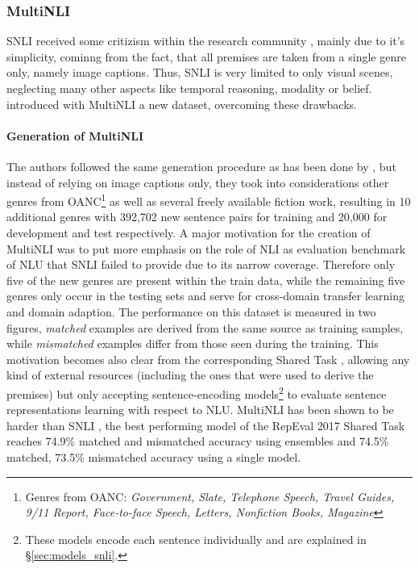 \subsubsection{MultiNLI}
\ac{SNLI} received some critizism within the research community \citep{chatzikyriakidis2017overview,williams2017broad}, mainly due to it's simplicity, cominng from the fact, that all premises are taken from a single genre only, namely image captions. Thus, \ac{SNLI} is very limited to only visual scenes, neglecting many other aspects like temporal reasoning, modality or belief. \cite{williams2017broad} introduced with \ac{MultiNLI} a new dataset, overcoming these drawbacks. 
\paragraph*{Generation of \ac{MultiNLI}}
The authors followed the same generation procedure as has been done by \cite{bowman2015large}, but instead of relying on image captions only, they took into considerations other genres from \ac{OANC}\footnote{Genres from \ac{OANC}: \textit{Government, Slate, Telephone Speech, Travel Guides, 9/11 Report, Face-to-face Speech, Letters, Nonfiction Books, Magazine}} \citep{ide2001american,ide2004american,ide2006integrating} as well as several freely available fiction work, resulting in 10 additional genres with 392,702 new sentence pairs for training and 20,000 for development and test respectively. A major motivation for the creation of \ac{MultiNLI} was to put more emphasis on the role of \ac{NLI} as evaluation benchmark of \ac{NLU} that \ac{SNLI} failed to provide due to its narrow coverage. Therefore only five of the new genres are present within the train data, while the remaining five genres only occur in the testing sets and serve  for cross-domain transfer learning and domain adaption. The performance on this dataset is measured in two figures, \textit{matched} examples are derived from the same source as training samples, while \textit{mismatched} examples differ from those seen during the training. This motivation becomes also clear from the corresponding Shared Task \citep{nangia2017repeval}, allowing any kind of external resources (including the ones that were used to derive the premises) but only accepting sentence-encoding models\footnote{These models encode each sentence individually and are explained in §\ref{sec:models_snli}.} to evaluate sentence representations learning with respect to \ac{NLU}. \ac{MultiNLI} has been shown to be harder than \ac{SNLI} \citep{williams2017broad}, the best performing model of the RepEval 2017 Shared Task reaches 74.9\% matched and mismatched accuracy \citep{chen2017recurrent} using ensembles and 74.5\% matched, 73.5\% mismatched accuracy using a single model\citep{nie2017shortcut}. 
